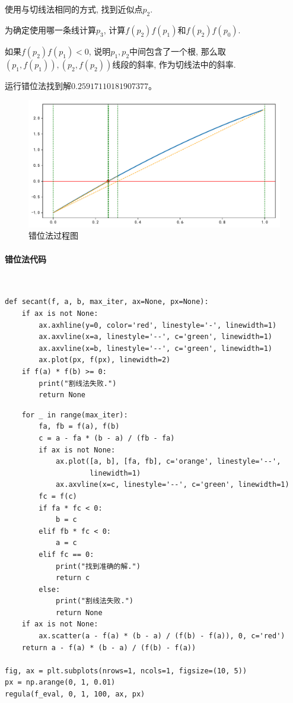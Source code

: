 使用与切线法相同的方式, 找到近似点$p_2$.

为确定使用哪一条线计算$p_3$, 计算$f\left(p_2 \right) f\left(p_1 \right)$和$f\left( p_2\right) f\left(p_0 \right)$.

如果$f\left(p_2 \right) f\left(p_1 \right) < 0$, 说明$p_1,p_2$中间包含了一个根, 那么取$\left(p_1,f\left(p_1\right) \right),\left(p_2,f\left(p_2 \right)\right)$线段的斜率, 作为切线法中的斜率.

运行错位法找到解$0.25917110181907377$。

\begin{figure}[H]
	\centering
	\caption{错位法过程图}
	\includegraphics[width=\linewidth]{fig12.pdf}
\end{figure}

\paragraph{错位法代码}
~\\
\begin{verbatim}
def secant(f, a, b, max_iter, ax=None, px=None):
    if ax is not None:
        ax.axhline(y=0, color='red', linestyle='-', linewidth=1)
        ax.axvline(x=a, linestyle='--', c='green', linewidth=1)
        ax.axvline(x=b, linestyle='--', c='green', linewidth=1)
        ax.plot(px, f(px), linewidth=2)
    if f(a) * f(b) >= 0:
        print("割线法失败.")
        return None
\end{verbatim}
\begin{verbatim}
    for _ in range(max_iter):
        fa, fb = f(a), f(b)
        c = a - fa * (b - a) / (fb - fa)
        if ax is not None:
            ax.plot([a, b], [fa, fb], c='orange', linestyle='--', 
                    linewidth=1)
            ax.axvline(x=c, linestyle='--', c='green', linewidth=1)
        fc = f(c)
        if fa * fc < 0:
            b = c
        elif fb * fc < 0:
            a = c
        elif fc == 0:
            print("找到准确的解.")
            return c
        else:
            print("割线法失败.")
            return None
    if ax is not None:
        ax.scatter(a - f(a) * (b - a) / (f(b) - f(a)), 0, c='red')
    return a - f(a) * (b - a) / (f(b) - f(a))

fig, ax = plt.subplots(nrows=1, ncols=1, figsize=(10, 5))
px = np.arange(0, 1, 0.01)
regula(f_eval, 0, 1, 100, ax, px)
\end{verbatim}